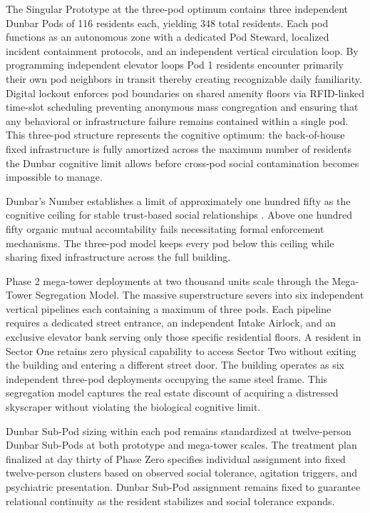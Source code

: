\documentclass[12pt, letterpaper]{article}
\begin{document}
The Singular Prototype at the three-pod optimum contains three independent Dunbar Pods of 116 residents each, yielding 348 total residents. Each pod functions as an autonomous zone with a dedicated Pod Steward, localized incident containment protocols, and an independent vertical circulation loop. By programming independent elevator loops Pod 1 residents encounter primarily their own pod neighbors in transit thereby creating recognizable daily familiarity. Digital lockout enforces pod boundaries on shared amenity floors via RFID-linked time-slot scheduling preventing anonymous mass congregation and ensuring that any behavioral or infrastructure failure remains contained within a single pod. This three-pod structure represents the cognitive optimum: the back-of-house fixed infrastructure is fully amortized across the maximum number of residents the Dunbar cognitive limit allows before cross-pod social contamination becomes impossible to manage.

Dunbar's Number establishes a limit of approximately one hundred fifty as the cognitive ceiling for stable trust-based social relationships \citep{dunbar_1992}. Above one hundred fifty organic mutual accountability fails necessitating formal enforcement mechanisms. The three-pod model keeps every pod below this ceiling while sharing fixed infrastructure across the full building.

Phase 2 mega-tower deployments at two thousand units scale through the Mega-Tower Segregation Model. The massive superstructure severs into six independent vertical pipelines each containing a maximum of three pods. Each pipeline requires a dedicated street entrance, an independent Intake Airlock, and an exclusive elevator bank serving only those specific residential floors. A resident in Sector One retains zero physical capability to access Sector Two without exiting the building and entering a different street door. The building operates as six independent three-pod deployments occupying the same steel frame. This segregation model captures the real estate discount of acquiring a distressed skyscraper without violating the biological cognitive limit.

Dunbar Sub-Pod sizing within each pod remains standardized at twelve-person Dunbar Sub-Pods at both prototype and mega-tower scales. The treatment plan finalized at day thirty of Phase Zero specifies individual assignment into fixed twelve-person clusters based on observed social tolerance, agitation triggers, and psychiatric presentation. Dunbar Sub-Pod assignment remains fixed to guarantee relational continuity as the resident stabilizes and social tolerance expands.
\end{document}
